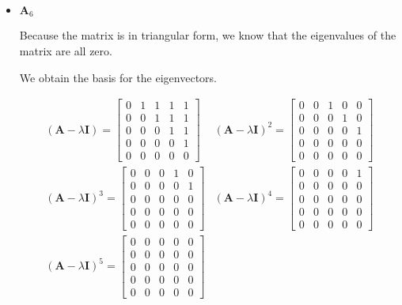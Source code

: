 \begin{itemize}


 \item $\mathbf{A}_6$

 Because the matrix is in triangular form,
 we know that the eigenvalues of the matrix are all zero.


 We obtain the basis for the eigenvectors.

\begin{align*}
 (\mathbf{A}-\lambda\mathbf{I}) = \begin{bmatrix}
        0 & 1 & 1 & 1 & 1\\
        0 & 0 & 1 & 1 & 1\\
        0 & 0 & 0 & 1 & 1\\
        0 & 0 & 0 & 0 & 1\\
        0 & 0 & 0 & 0 & 0
    \end{bmatrix}
    &
 (\mathbf{A}-\lambda\mathbf{I})^2 = \begin{bmatrix}
        0 & 0 & 1 & 0 & 0 \\
        0 & 0 & 0 & 1 & 0 \\
        0 & 0 & 0 & 0 & 1 \\
        0 & 0 & 0 & 0 & 0 \\
        0 & 0 & 0 & 0 & 0
    \end{bmatrix}
\\
 (\mathbf{A}-\lambda\mathbf{I})^3 = \begin{bmatrix}
        0 & 0 & 0 & 1 & 0 \\
        0 & 0 & 0 & 0 & 1 \\
        0 & 0 & 0 & 0 & 0 \\
        0 & 0 & 0 & 0 & 0 \\
        0 & 0 & 0 & 0 & 0
    \end{bmatrix}
&
 (\mathbf{A}-\lambda\mathbf{I})^4 = \begin{bmatrix}
        0 & 0 & 0 & 0 & 1\\
        0 & 0 & 0 & 0 & 0\\
        0 & 0 & 0 & 0 & 0\\
        0 & 0 & 0 & 0 & 0\\
        0 & 0 & 0 & 0 & 0
        \end{bmatrix}
\\
 (\mathbf{A}-\lambda\mathbf{I})^5 = \begin{bmatrix}
        0 & 0 & 0 & 0 & 0\\
        0 & 0 & 0 & 0 & 0\\
        0 & 0 & 0 & 0 & 0\\
        0 & 0 & 0 & 0 & 0\\
        0 & 0 & 0 & 0 & 0
        \end{bmatrix}&
\end{align*}


\end{itemize}
